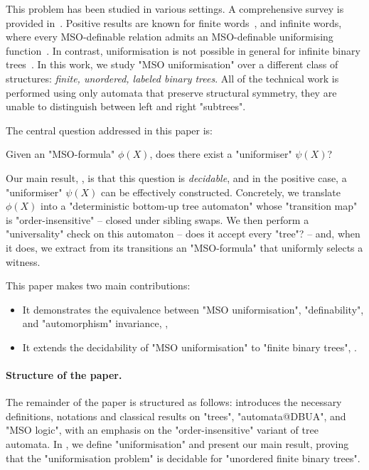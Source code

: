 \documentclass[a4paper,UKenglish,cleveref, autoref, thm-restate]{lipics-v2021}
\begin{document}
This problem has been studied in various settings. A comprehensive survey is provided in~\cite{Cara15}. Positive results are known for finite words~\cite{Choffrut1999},
and infinite words, where every MSO-definable relation admits an MSO-definable uniformising function~\cite{Siefkes1975, Choffrut1999, Rabin07}. In contrast, uniformisation
is not possible in general for infinite binary trees~\cite{GS83}.
In this work, we study "MSO uniformisation" over a different class of structures: \emph{finite, unordered, labeled binary trees}.
All of the technical work is performed using only automata that preserve structural symmetry,
\ie they are unable to distinguish between left and right "subtrees".

The central question addressed in this paper is:

\begin{problem}\label{prob:uniformisation-problem}
\AP Given an "MSO-formula" $\phi(X)$, does there exist a "uniformiser" $\psi(X)$?
\end{problem}

Our main result, , is that this question is \emph{decidable}, and in the positive case, a "uniformiser" $\psi(X)$ can be effectively constructed. Concretely, we translate $\phi(X)$ into a
"deterministic bottom-up tree automaton" whose "transition map" is "order-insensitive" -- closed under sibling swaps. We then perform a "universality" check on this
automaton -- does it accept every "tree"? -- and, when it does, we extract from its transitions an "MSO-formula" that uniformly selects a witness.

This paper makes two main contributions:
\begin{itemize}
	\item It demonstrates the equivalence between "MSO uniformisation", "definability", and "automorphism" invariance, ,
	\item It extends the decidability of "MSO uniformisation" to "finite binary trees", .
\end{itemize}


\paragraph*{Structure of the paper.} The remainder of the paper is structured as follows:
 introduces the necessary definitions, notations and classical results on "trees", "automata@DBUA", and "MSO logic", with an emphasis on the "order-insensitive"
variant of tree automata.
In , we define "uniformisation" and present our main result, proving that the "uniformisation problem" is decidable for "unordered finite binary trees".
\end{document}
